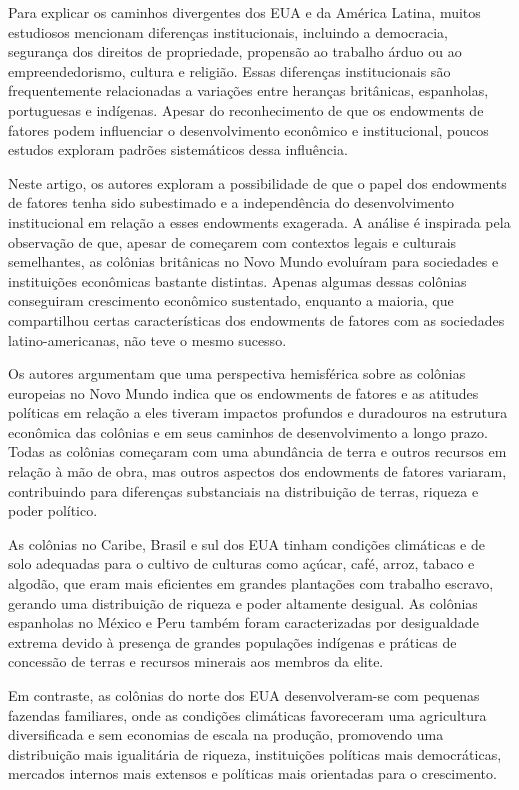 \documentclass[a4paper,12pt]{article}[abntex2]
\begin{document}
Para explicar os caminhos divergentes dos EUA e da América Latina, muitos estudiosos mencionam diferenças institucionais, incluindo a democracia, segurança dos direitos de propriedade, propensão ao trabalho árduo ou ao empreendedorismo, cultura e religião. Essas diferenças institucionais são frequentemente relacionadas a variações entre heranças britânicas, espanholas, portuguesas e indígenas. Apesar do reconhecimento de que os endowments de fatores podem influenciar o desenvolvimento econômico e institucional, poucos estudos exploram padrões sistemáticos dessa influência.

Neste artigo, os autores exploram a possibilidade de que o papel dos endowments de fatores tenha sido subestimado e a independência do desenvolvimento institucional em relação a esses endowments exagerada. A análise é inspirada pela observação de que, apesar de começarem com contextos legais e culturais semelhantes, as colônias britânicas no Novo Mundo evoluíram para sociedades e instituições econômicas bastante distintas. Apenas algumas dessas colônias conseguiram crescimento econômico sustentado, enquanto a maioria, que compartilhou certas características dos endowments de fatores com as sociedades latino-americanas, não teve o mesmo sucesso.

Os autores argumentam que uma perspectiva hemisférica sobre as colônias europeias no Novo Mundo indica que os endowments de fatores e as atitudes políticas em relação a eles tiveram impactos profundos e duradouros na estrutura econômica das colônias e em seus caminhos de desenvolvimento a longo prazo. Todas as colônias começaram com uma abundância de terra e outros recursos em relação à mão de obra, mas outros aspectos dos endowments de fatores variaram, contribuindo para diferenças substanciais na distribuição de terras, riqueza e poder político.

As colônias no Caribe, Brasil e sul dos EUA tinham condições climáticas e de solo adequadas para o cultivo de culturas como açúcar, café, arroz, tabaco e algodão, que eram mais eficientes em grandes plantações com trabalho escravo, gerando uma distribuição de riqueza e poder altamente desigual. As colônias espanholas no México e Peru também foram caracterizadas por desigualdade extrema devido à presença de grandes populações indígenas e práticas de concessão de terras e recursos minerais aos membros da elite.

Em contraste, as colônias do norte dos EUA desenvolveram-se com pequenas fazendas familiares, onde as condições climáticas favoreceram uma agricultura diversificada e sem economias de escala na produção, promovendo uma distribuição mais igualitária de riqueza, instituições políticas mais democráticas, mercados internos mais extensos e políticas mais orientadas para o crescimento.
\end{document}
